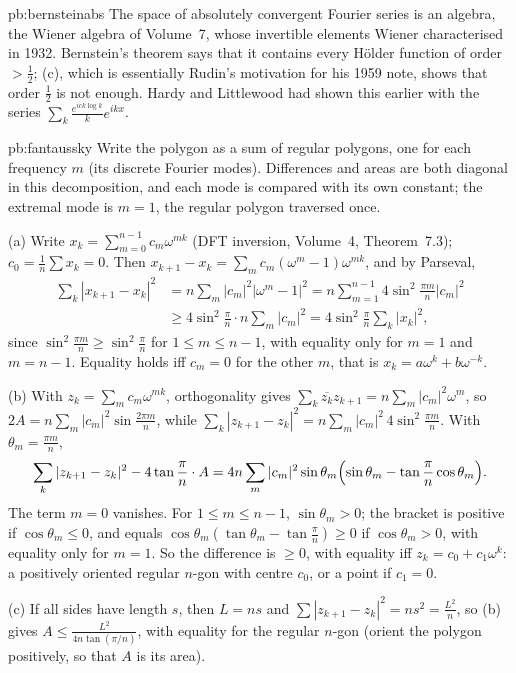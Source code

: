\begin{solution}{pb:bernsteinabs}
\leads The space of absolutely convergent Fourier series is an algebra, the Wiener algebra of Volume~7, whose invertible elements Wiener
characterised in 1932. Bernstein's theorem says that it contains every Hölder function of order $>\frac12$; (c), which is essentially
Rudin's motivation for his 1959 note, shows that order $\frac12$ is not enough. Hardy and Littlewood had shown this earlier with the series
$\sum_k\frac{e^{ick\log k}}ke^{ikx}$.
\end{solution}

\begin{solution}{pb:fantaussky}
\idea Write the polygon as a sum of regular polygons, one for each frequency $m$ (its discrete Fourier modes). Differences and areas
are both diagonal in this decomposition, and each mode is compared with its own constant; the extremal mode is $m=1$, the regular
polygon traversed once.

\writeup (a) Write $x_k=\sum_{m=0}^{n-1}c_m\omega^{mk}$ (DFT inversion, Volume~4, Theorem~7.3); $c_0=\frac1n\sum x_k=0$. Then $x_{k+1}-x_k=\sum_mc_m(\omega^m-1)\omega^{mk}$, and by
Parseval,
\[
\begin{aligned}\sum_k|x_{k+1}-x_k|^2&=n\sum_m|c_m|^2|\omega^m-1|^2=n\sum_{m=1}^{n-1}4\sin^2\frac{\pi m}n|c_m|^2\\&\ge4\sin^2\frac\pi n\cdot n\sum_m|c_m|^2=4\sin^2\frac\pi n\sum_k|x_k|^2,\end{aligned}
\]
since $\sin^2\frac{\pi m}n\ge\sin^2\frac\pi n$ for $1\le m\le n-1$, with equality only for $m=1$ and $m=n-1$. Equality holds iff $c_m=0$ for the other $m$, that is
$x_k=a\omega^k+b\omega^{-k}$.

(b) With $z_k=\sum_mc_m\omega^{mk}$, orthogonality gives $\sum_k\overline{z_k}z_{k+1}=n\sum_m|c_m|^2\omega^m$, so $2A=n\sum_m|c_m|^2\sin\frac{2\pi m}n$, while
$\sum_k|z_{k+1}-z_k|^2=n\sum_m|c_m|^2\,4\sin^2\frac{\pi m}n$. With $\theta_m=\frac{\pi m}n$,
\[
\sum_k|z_{k+1}-z_k|^2-4\tan\frac\pi n\cdot A=4n\sum_m|c_m|^2\sin\theta_m\Bigl(\sin\theta_m-\tan\frac\pi n\cos\theta_m\Bigr).
\]
The term $m=0$ vanishes. For $1\le m\le n-1$, $\sin\theta_m>0$; the bracket is positive if $\cos\theta_m\le0$, and equals $\cos\theta_m(\tan\theta_m-\tan\frac\pi n)\ge0$ if
$\cos\theta_m>0$, with equality only for $m=1$. So the difference is $\ge0$, with equality iff $z_k=c_0+c_1\omega^k$: a positively oriented regular $n$-gon
with centre $c_0$, or a point if $c_1=0$.

(c) If all sides have length $s$, then $L=ns$ and $\sum|z_{k+1}-z_k|^2=ns^2=\frac{L^2}n$, so (b) gives $A\le\frac{L^2}{4n\tan(\pi/n)}$, with equality for the regular
$n$-gon (orient the polygon positively, so that $A$ is its area).


\end{solution}
